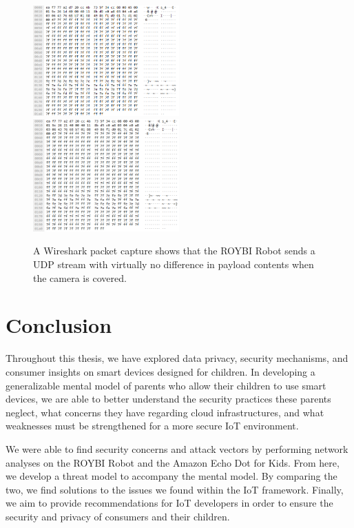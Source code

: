 \documentclass[12pt]{ucthesis}
\begin{document}
\begin{figure}
    \includegraphics[width=0.5\textwidth]{unencrypted1.png}
    \includegraphics[width=0.5\textwidth]{unencrypted2.png}
    \caption{A Wireshark packet capture shows that the ROYBI Robot sends a UDP stream with virtually no difference in payload contents when the camera is covered.}
    \label{fig:unencrypted}
\end{figure}

\chapter{Conclusion}
\label{ch:conclusion}
Throughout this thesis, we have explored data privacy, security mechanisms, and consumer insights on smart devices designed for children. In developing a generalizable mental model of parents who allow their children to use smart devices, we are able to better understand the security practices these parents neglect, what concerns they have regarding cloud infrastructures, and what weaknesses must be strengthened for a more secure IoT environment.

We were able to find security concerns and attack vectors by performing network analyses on the ROYBI Robot and the Amazon Echo Dot for Kids. From here, we develop a threat model to accompany the mental model. By comparing the two, we find solutions to the issues we found within the IoT framework. Finally, we aim to provide recommendations for IoT developers in order to ensure the security and privacy of consumers and their children.
\end{document}
